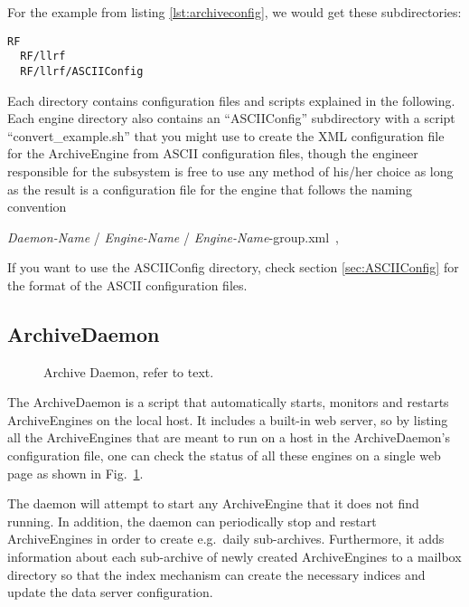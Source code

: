 For the example from listing \ref{lst:archiveconfig}, we would get
these subdirectories:
\begin{lstlisting}[frame=none,keywordstyle=\sffamily]
  RF
  RF/llrf
  RF/llrf/ASCIIConfig
\end{lstlisting}
\noindent Each directory contains configuration files and scripts
explained in the following. Each engine directory also contains an
``ASCIIConfig'' subdirectory with a script ``convert\_example.sh''
that you might use to create the XML configuration file for the
ArchiveEngine from ASCII configuration files, though the engineer
responsible for the subsystem is free to use any method of his/her
choice as long as the result is a configuration file for the engine
that follows the naming convention
\begin{center}
{\it Daemon-Name} / {\it Engine-Name} / {\it Engine-Name}-group.xml~,\\
\end{center}
If you want to use the ASCIIConfig directory, check section
\ref{sec:ASCIIConfig} for the format of the ASCII configuration files.

\subsection{ArchiveDaemon} \label{sec:daemon}
\begin{figure}[htb]
\begin{center}
\end{center}
\caption{\label{fig:daemon}Archive Daemon, refer to text.}
\end{figure}

\noindent The ArchiveDaemon is a script that automatically starts,
monitors and restarts ArchiveEngines on the local host. It includes a
built-in web server, so by listing all the ArchiveEngines that are
meant to run on a host in the ArchiveDaemon's configuration file, one
can check the status of all these engines on a single web page as
shown in Fig.~\ref{fig:daemon}.

The daemon will attempt to start any ArchiveEngine
that it does not find running. In addition, the daemon can
periodically stop and restart ArchiveEngines in order to create
e.g.\ daily sub-archives.  Furthermore, it adds information about
each sub-archive of newly created ArchiveEngines to a mailbox directory
so that the index mechanism can create the necessary indices
and update the data server configuration.

